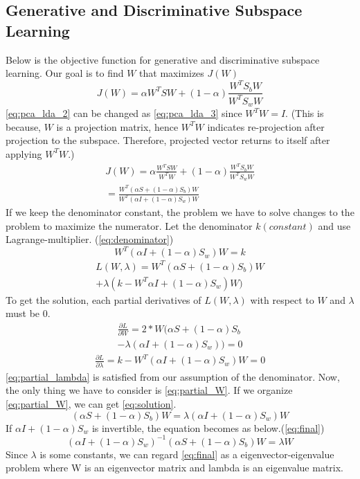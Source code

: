 \subsection{Generative and Discriminative Subspace Learning}
\label{sec:intro}
Below is the objective function for generative and discriminative subspace learning. Our goal is to find $W$ that maximizes $J(W)$
\begin{equation}
	J(W) = \alpha W^TSW+(1-\alpha) \frac{W^TS_bW}{W^TS_wW}
	\label{eq:pca_lda_2}
\end{equation}
\cref{eq:pca_lda_2} can be changed as \cref{eq:pca_lda_3} since $W^TW=I$. (This is because, $W$ is a projection matrix, hence $W^TW$ indicates re-projection after projection to the subspace. Therefore, projected vector returns to itself after applying $W^TW$.)
\begin{multline}
	J(W) = \alpha \frac{W^TSW}{W^TW}+(1-\alpha) \frac{W^TS_bW}{W^TS_wW} \\
	= \frac{W^T(\alpha S + (1-\alpha)S_b)W}{W^T(\alpha I + (1-\alpha)S_w)W}
	\label{eq:pca_lda_3}
\end{multline}
If we keep the denominator constant, the problem we have to solve changes to the problem to maximize the numerator. Let the denominator $k(constant)$ and use Lagrange-multiplier. (\cref{eq:denominator})
\begin{equation}
	W^T(\alpha I + (1-\alpha)S_w)W = k
	\label{eq:denominator}
\end{equation}
\begin{multline}
	L(W,\lambda)=W^T(\alpha S + (1-\alpha)S_b)W \\
	+ \lambda(k-W^T\alpha I + (1-\alpha)S_w)W)
	\label{eq:lagrange}
\end{multline}
To get the solution, each partial derivatives of $L(W,\lambda)$ with respect to $W$ and $\lambda$ must be 0.
\begin{multline}
	\frac{\partial L}{\partial W} = 2*W(\alpha S+(1-\alpha)S_b \\
	-\lambda(\alpha I+(1-\alpha)S_w))=0
	\label{eq:partial_W}
\end{multline}
\begin{multline}
	\frac{\partial L}{\partial \lambda} = k - W^T(\alpha I+(1-\alpha)S_w)W=0
	\label{eq:partial_lambda}
\end{multline}
\cref{eq:partial_lambda} is satisfied from our assumption of the denominator. Now, the only thing we have to consider is \cref{eq:partial_W}. If we organize \cref{eq:partial_W}, we can get \cref{eq:solution}.
\begin{equation}
	(\alpha S+(1-\alpha)S_b)W = \lambda (\alpha I + (1-\alpha)S_w)W
	\label{eq:solution}
\end{equation}
If $\alpha I + (1-\alpha)S_w$ is invertible, the equation becomes as below.(\cref{eq:final})
\begin{equation}
	(\alpha I + (1-\alpha)S_w)^{-1}(\alpha S+(1-\alpha)S_b)W = \lambda W
	\label{eq:final}
\end{equation}
Since $\lambda$ is some constants, we can regard \cref{eq:final} as a eigenvector-eigenvalue problem where W is an eigenvector matrix and lambda is an eigenvalue matrix.

